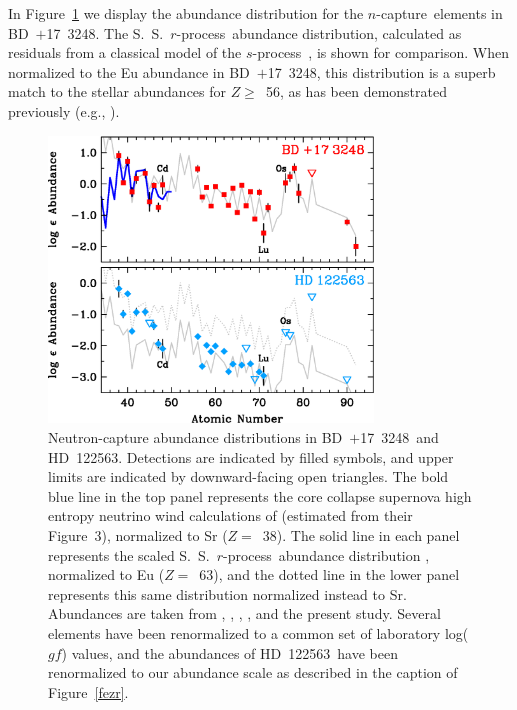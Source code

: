 \documentclass{emulateapj}
\def\bd{\mbox{BD~$+$17~3248}}
\def\hd{\mbox{HD~122563}}
\def\rpro{\mbox{$r$-process}}
\def\spro{\mbox{$s$-process}}
\def\ncap{\mbox{$n$-capture}}
\begin{document}
In Figure~\ref{solarr} we display the abundance distribution for
the \ncap\ elements in \bd.
The S.~S.\ \rpro\ abundance distribution,
calculated as residuals from a classical model of the \spro\
\citep{sneden08}, is shown for comparison.
When normalized to the Eu abundance in \bd, this distribution
is a superb match to the stellar abundances for $Z \geq$~56, as has
been demonstrated previously (e.g., \citealt{cowan02}).

\begin{figure}
\begin{center}
\includegraphics[angle=0,width=3.4in]{f4.eps}
\end{center}
\caption{
\label{solarr}
Neutron-capture abundance distributions in \bd\ and \hd.
Detections are indicated by filled symbols, and upper limits
are indicated by downward-facing open triangles.
The bold blue line in the top panel represents the core collapse
supernova high entropy neutrino wind calculations of 
\citet{farouqi09} (estimated from their Figure~3), normalized to 
Sr ($Z =$~38).
The solid line in each panel represents the scaled S.~S.\ \rpro\ abundance
distribution \citep{sneden08}, normalized to Eu ($Z =$~63),
and the dotted line in the lower panel represents this 
same distribution normalized instead to Sr.
Abundances are taken from \citet{cowan02,cowan05},
\citet{honda06}, \citet{roederer09}, \citet{sneden09},
and the present study.
Several elements have been renormalized to a common set of
laboratory log($gf$) values, and the abundances of
\hd\ have been renormalized to our abundance scale
as described in the caption of Figure~\ref{fezr}.
}
\end{figure}
\end{document}
